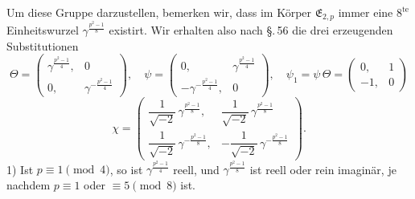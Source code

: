 Um diese Gruppe darzustellen, bemerken wir, dass im Körper
$\mathfrak{E}_{2,p}$ immer eine $8^{\mathrm{te}}$ Einheitswurzel
$\gamma^{\frac{p^2-1}{8}}$ existirt. Wir erhalten also nach \S.\,56 die
drei erzeugenden Substitutionen
\[
\Theta = \begin{pmatrix} \gamma^{\frac{p^2-1}{4}}, & 0 \\[2pt] 0, & \gamma^{-\frac{p^2-1}{4}} \end{pmatrix},
\quad
\psi = \begin{pmatrix} 0, & \gamma^{\frac{p^2-1}{4}} \\[2pt] -\gamma^{-\frac{p^2-1}{4}}, & 0 \end{pmatrix},
\quad
\psi_1 = \psi\,\Theta = \begin{pmatrix} 0, & 1 \\ -1, & 0 \end{pmatrix}
\]
\[
\chi = \begin{pmatrix} \dfrac{1}{\sqrt{-2}}\,\gamma^{\frac{p^2-1}{8}}, & \dfrac{1}{\sqrt{-2}}\,\gamma^{\frac{p^2-1}{8}} \\[8pt] \dfrac{1}{\sqrt{-2}}\,\gamma^{-\frac{p^2-1}{8}}, & -\dfrac{1}{\sqrt{-2}}\,\gamma^{-\frac{p^2-1}{8}} \end{pmatrix}.
\]
1) Ist $p \equiv 1 \pmod 4$, so ist $\gamma^{\frac{p^2-1}{4}}$ reell,
und $\gamma^{\frac{p^2-1}{8}}$ ist reell oder rein imaginär, je
nachdem $p \equiv 1$ oder $\equiv 5 \pmod 8$ ist.
